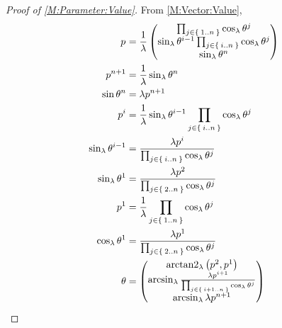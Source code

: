 \documentclass[../methodology.tex]{subfiles}
\begin{document}
\begin{proof}[Proof of \cref{M:Parameter:Value}]
    From \cref{M:Vector:Value},
    \begin{align*}
        \tensor{p}{}
                                              & =
        \frac{1}{\lambda}
        \begin{pmatrix}
            \prod_{j\in\Set{1..n}}{\cos_\lambda{\tensor{\theta}{^j}}}                                      \\
            \sin_\lambda{\tensor{\theta}{^{i-1}}}\prod_{j\in\Set{i..n}}{\cos_\lambda{\tensor{\theta}{^j}}} \\
            \sin_\lambda{{\tensor{\theta}{^n}}}                                                            \\
        \end{pmatrix}                                           \\
        \tensor{p}{^{n+1}}                    & = \frac{1}{\lambda}\sin_\lambda{\tensor{\theta}{^n}}                                                              \\
        \sin{\tensor{\theta}{^{n}}}           & = \lambda\tensor{p}{^{n+1}}                                                                                       \\
        \tensor{p}{^{i}}                      & = \frac{1}{\lambda}\sin_\lambda{\tensor{\theta}{^{i-1}}}\prod_{j\in\Set{i..n}}{\cos_\lambda{\tensor{\theta}{^j}}} \\
        \sin_\lambda{\tensor{\theta}{^{i-1}}} & = \frac{\lambda\tensor{p}{^{i}}}{\prod_{j\in\Set{i..n}}{\cos_\lambda{\tensor{\theta}{^j}}}}                       \\
        \sin_\lambda{\tensor{\theta}{^{1}}}   & = \frac{\lambda\tensor{p}{^2}}{\prod_{j\in\Set{2..n}}{\cos_\lambda{\tensor{\theta}{^j}}}}                         \\
        \tensor{p}{^1}                        & = \frac{1}{\lambda}\prod_{j\in\Set{1..n}}{\cos_\lambda{\tensor{\theta}{^j}}}                                      \\
        \cos_\lambda{\tensor{\theta}{^{1}}}   & = \frac{\lambda\tensor{p}{^1}}{\prod_{j\in\Set{2..n}}{\cos_\lambda{\tensor{\theta}{^j}}}}                         \\
        \theta                                & =
        \begin{pmatrix}
            \arctantwo_\lambda{\left(\tensor{p}{^2},\tensor{p}{^1}\right)}                                                 \\
            \arcsin_\lambda{\frac{\lambda\tensor{p}{^{i+1}}}{\prod_{j\in\Set{i+1..n}}{\cos_\lambda{\tensor{\theta}{^j}}}}} \\
            \arcsin_\lambda{\lambda\tensor{p}{^{n+1}}}                                                                     \\
        \end{pmatrix}
    \end{align*}
\end{proof}
\end{document}
